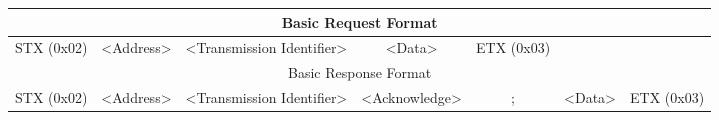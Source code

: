 \documentclass[preview]{standalone}
\begin{document}

\begin{tabular}{|c|c|c|c|c|c|c|}
    \hline
    \multicolumn{7}{|c|}{Basic Request Format}\\
    \hline
    STX (0x02) & <Address> & <Transmission Identifier> & <Data> & ETX (0x03)& \multicolumn{2}{|c|}{}\\
    \hline
    \multicolumn{7}{|c|}{Basic Response Format}\\
    \hline
    STX (0x02)& <Address> & <Transmission Identifier> & <Acknowledge> & ; & <Data> & ETX (0x03)\\
    \hline
\end{tabular}
\end{document}
